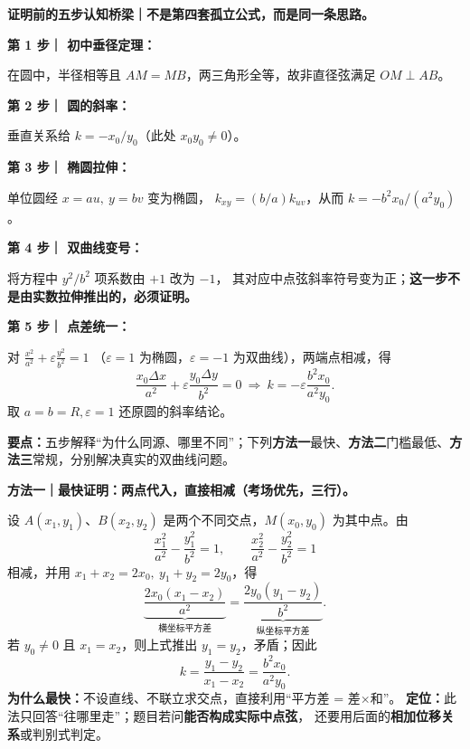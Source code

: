 
\clearpage
\begin{proofbox}
\textbf{证明前的五步认知桥梁｜不是第四套孤立公式，而是同一条思路。}
\par\medskip\noindent
\textbf{第 1 步｜ 初中垂径定理：}
\par\nopagebreak\noindent
在圆中，半径相等且 $AM=MB$，两三角形全等，故非直径弦满足 $OM\perp AB$。
\par\medskip\noindent
\textbf{第 2 步｜ 圆的斜率：}
\par\nopagebreak\noindent
垂直关系给 $k=-x_0/y_0$（此处 $x_0y_0\ne0$）。
\par\medskip\noindent
\textbf{第 3 步｜ 椭圆拉伸：}
\par\nopagebreak\noindent
单位圆经 $x=au,\ y=bv$ 变为椭圆，
$k_{xy}=(b/a)k_{uv}$，从而 $k=-b^2x_0/(a^2y_0)$。
\par\medskip\noindent
\textbf{第 4 步｜ 双曲线变号：}
\par\nopagebreak\noindent
将方程中 $y^2/b^2$ 项系数由 $+1$ 改为 $-1$，
其对应中点弦斜率符号变为正；\textbf{这一步不是由实数拉伸推出的，必须证明。}
\par\medskip\noindent
\textbf{第 5 步｜ 点差统一：}
\par\nopagebreak\noindent
对
$\frac{x^2}{a^2}+\varepsilon\frac{y^2}{b^2}=1$
（$\varepsilon=1$ 为椭圆，$\varepsilon=-1$ 为双曲线），两端点相减，得
\[
\frac{x_0\Delta x}{a^2}+\varepsilon\frac{y_0\Delta y}{b^2}=0
\ \Longrightarrow\
\boxed{k=-\varepsilon\frac{b^2x_0}{a^2y_0}}.
\]
取 $a=b=R,\varepsilon=1$ 还原圆的斜率结论。
\par\medskip\noindent
\textbf{要点：}五步解释“为什么同源、哪里不同”；下列\textbf{方法一}最快、\textbf{方法二}门槛最低、\textbf{方法三}常规，分别解决真实的双曲线问题。
\end{proofbox}
\clearpage
\begin{proofbox}
\textbf{方法一｜最快证明：两点代入，直接相减（考场优先，三行）。}
\begin{center}\end{center}
设 $A(x_1,y_1)$、$B(x_2,y_2)$ 是两个不同交点，$M(x_0,y_0)$ 为其中点。由
\[
\frac{x_1^2}{a^2}-\frac{y_1^2}{b^2}=1,\qquad
\frac{x_2^2}{a^2}-\frac{y_2^2}{b^2}=1
\]
相减，并用 $x_1+x_2=2x_0,\ y_1+y_2=2y_0$，得
\[
\underbrace{\frac{2x_0(x_1-x_2)}{a^2}}_{\text{横坐标平方差}}
=\underbrace{\frac{2y_0(y_1-y_2)}{b^2}}_{\text{纵坐标平方差}}.
\]
若 $y_0\ne0$ 且 $x_1=x_2$，则上式推出 $y_1=y_2$，矛盾；因此
\[
\boxed{k=\frac{y_1-y_2}{x_1-x_2}=\frac{b^2x_0}{a^2y_0}}.
\]
\textbf{为什么最快：}不设直线、不联立求交点，直接利用``平方差 = 差$\times$和''。
\textbf{定位：}此法只回答``往哪里走''；题目若问\textbf{能否构成实际中点弦}，
还要用后面的\textbf{相加位移关系}或判别式判定。
\end{proofbox}
